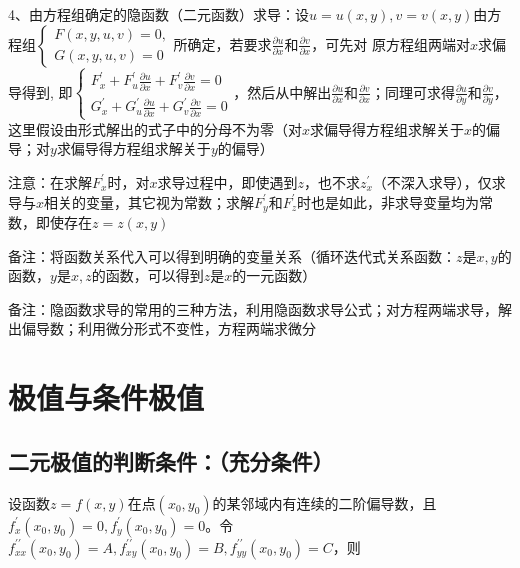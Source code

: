 4、由方程组确定的隐函数（二元函数）求导：设$u=u(x, y), v=v(x, y)$由方程组$\left\{\begin{array}{l}F(x, y, u, v)=0, \\ G(x, y, u, v)=0\end{array}\right.$所确定，若要求$\frac{\partial u}{\partial x}$和$\frac{\partial v}{\partial x}$，可先对 原方程组两端对$x$求偏导得到, 即$\left\{\begin{array}{l} F_{x}^{\prime}+F_{u}^{\prime} \frac{\partial u}{\partial x}+F_{v}^{\prime} \frac{\partial v}{\partial x}=0 \\ G_{x}^{\prime}+G_{u}^{\prime} \frac{\partial u}{\partial x}+G_{v}^{\prime} \frac{\partial v}{\partial x}=0 \end{array}\right.$，然后从中解出$\frac{\partial u}{\partial x}$和$\frac{\partial v}{\partial x}$；同理可求得$\frac{\partial u}{\partial y}$和$\frac{\partial v}{\partial y}$，这里假设由形式解出的式子中的分母不为零（对$x$求偏导得方程组求解关于$x$的偏导；对$y$求偏导得方程组求解关于$y$的偏导）

注意：在求解$F^{\prime}_x$时，对$x$求导过程中，即使遇到$z$，也不求$z^{\prime}_x$（不深入求导），仅求导与$x$相关的变量，其它视为常数；求解$F^{\prime}_y$和$F^{\prime}_z$时也是如此，非求导变量均为常数，即使存在$z=z(x, y)$

备注：将函数关系代入可以得到明确的变量关系（循环迭代式关系函数：$z$是$x,y$的函数，$y$是$x,z$的函数，可以得到$z$是$x$的一元函数）

备注：隐函数求导的常用的三种方法，利用隐函数求导公式；对方程两端求导，解出偏导数；利用微分形式不变性，方程两端求微分

\section{极值与条件极值}



\subsection{二元极值的判断条件：（充分条件）}

设函数$z=f(x, y)$在点$\left(x_{0}, y_{0}\right)$的某邻域内有连续的二阶偏导数，且$f_{x}^{\prime}\left(x_{0}, y_{0}\right)=0, f_{y}^{\prime}\left(x_{0}, y_{0}\right)=0$。令$f_{x x}^{\prime \prime}\left(x_{0}, y_{0}\right)=A, f_{x y}^{\prime \prime}\left(x_{0}, y_{0}\right)=B, f_{y y}^{\prime \prime}\left(x_{0}, y_{0}\right)=C$，则

